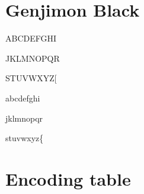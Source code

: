\documentclass[12pt]{article}
\begin{document}
\clearpage


\section{Genjimon Black}

{
ABCDEFGHI

JKLMNOPQR

STUVWXYZ[

abcdefghi

jklmnopqr

stuvwxyz\{}

\clearpage


\section{Encoding table}
\end{document}
